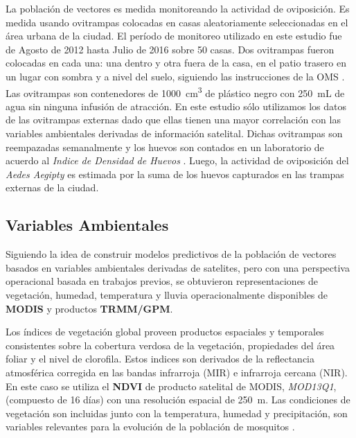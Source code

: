   \par La población de vectores es medida monitoreando la actividad de oviposición.
    Es medida usando ovitrampas colocadas en casas aleatoriamente seleccionadas
    en el área urbana de la ciudad. El período de monitoreo utilizado en este
    estudio fue de Agosto de 2012 hasta Julio de 2016 sobre 50 casas. Dos
    ovitrampas fueron colocadas en cada una: una dentro y otra fuera de la casa,
    en el patio trasero en un lugar con sombra y a nivel del suelo, siguiendo
    las instrucciones de la OMS \cite{peridomestic}. Las ovitrampas son contenedores
    de \SI{1000}{\centi\meter\cubed} de plástico negro con \SI{250}{\milli\liter}
    de agua sin ninguna infusión de atracción.
    En este estudio sólo utilizamos los datos de las ovitrampas externas dado
    que ellas tienen una mayor correlación con las variables ambientales
    derivadas de información satelital. Dichas ovitrampas son reempazadas
    semanalmente y los huevos son contados en un laboratorio de acuerdo al
    \textit{Indice de Densidad de Huevos} \cite{indice_huevos}. Luego, la
    actividad de oviposición del \textit{Aedes Aegipty} es estimada por la suma
    de los huevos capturados en las trampas externas de la ciudad.



\subsection{Variables Ambientales}

  \par Siguiendo la idea de construir modelos predictivos de la población de
    vectores basados en variables ambientales derivadas de satelites, pero con una
    perspectiva operacional basada en trabajos previos, se obtuvieron representaciones
    de vegetación, humedad, temperatura y lluvia operacionalmente disponibles
    de \textbf{MODIS} y productos \textbf{TRMM/GPM}.

  \par Los índices de vegetación global proveen productos espaciales y
    temporales consistentes sobre la cobertura verdosa de la vegetación,
    propiedades del área foliar y el nivel de clorofila. Estos indices son
    derivados de la reflectancia atmosférica
    corregida en las bandas infrarroja (MIR) e infrarroja cercana (NIR).
    En este caso se utiliza el \textbf{NDVI} de producto satelital
    de MODIS, \textit{MOD13Q1}, (compuesto de 16 días) con una resolución espacial de
    \SI{250}{\meter}.
    Las condiciones de vegetación son incluidas junto con la temperatura,
    humedad y precipitación, son variables relevantes para la evolución de la
    población de mosquitos \cite{ndwi_erffectiveness, rs_invertebrate}.

